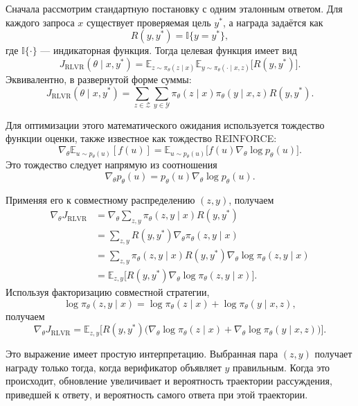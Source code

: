 Сначала рассмотрим стандартную постановку с одним эталонным ответом. Для каждого запроса \(x\) существует проверяемая цель \(y^{*}\), а награда задаётся как
\[
    R(y,y^{*})=\mathbb{I}\{y=y^{*}\},
\]
где \(\mathbb{I}\{\cdot\}\) --- индикаторная функция. Тогда целевая функция имеет вид
\[
    J_{\mathrm{RLVR}}(\theta\mid x,y^{*})
    =
    \mathbb{E}_{z\sim\pi_{\theta}(z\mid x)}
    \mathbb{E}_{y\sim\pi_{\theta}(\cdot\mid x,z)}
    \big[
        R(y,y^{*})
        \big].
\]
Эквивалентно, в развернутой форме суммы:
\[
    J_{\mathrm{RLVR}}(\theta\mid x,y^{*})
    =
    \sum_{z\in\mathcal{Z}}
    \sum_{y\in\mathcal{Y}}
    \pi_{\theta}(z\mid x)
    \pi_{\theta}(y\mid x,z)
    R(y,y^{*}).
\]

Для оптимизации этого математического ожидания используется тождество функции оценки, также известное как тождество REINFORCE:
\[
    \nabla_{\theta}
    \mathbb{E}_{u\sim p_{\theta}(u)}
        [f(u)]
    =
    \mathbb{E}_{u\sim p_{\theta}(u)}
    \big[
        f(u)\nabla_{\theta}\log p_{\theta}(u)
        \big].
\]
Это тождество следует напрямую из соотношения
\[
    \nabla_{\theta}p_{\theta}(u)
    =
    p_{\theta}(u)
    \nabla_{\theta}\log p_{\theta}(u).
\]

Применяя его к совместному распределению \((z,y)\), получаем
\begin{align*}
    \nabla_{\theta}J_{\mathrm{RLVR}}
     & =
    \nabla_{\theta}
    \sum_{z,y}
    \pi_{\theta}(z,y\mid x)
    R(y,y^{*})
    \\
     & =
    \sum_{z,y}
    R(y,y^{*})
    \nabla_{\theta}
    \pi_{\theta}(z,y\mid x)
    \\
     & =
    \sum_{z,y}
    \pi_{\theta}(z,y\mid x)
    R(y,y^{*})
    \nabla_{\theta}
    \log\pi_{\theta}(z,y\mid x)
    \\
     & =
    \mathbb{E}_{z,y}
    \Big[
        R(y,y^{*})
        \nabla_{\theta}
        \log\pi_{\theta}(z,y\mid x)
        \Big].
\end{align*}
Используя факторизацию совместной стратегии,
\[
    \log\pi_{\theta}(z,y\mid x)
    =
    \log\pi_{\theta}(z\mid x)
    +
    \log\pi_{\theta}(y\mid x,z),
\]
получаем
\[
    \nabla_{\theta}J_{\mathrm{RLVR}}
    =
    \mathbb{E}_{z,y}
    \Big[
        R(y,y^{*})
        \big(
        \nabla_{\theta}\log\pi_{\theta}(z\mid x)
        +
        \nabla_{\theta}\log\pi_{\theta}(y\mid x,z)
        \big)
        \Big].
\]

Это выражение имеет простую интерпретацию. Выбранная пара \((z,y)\) получает награду только тогда, когда верификатор объявляет \(y\) правильным. Когда это происходит, обновление увеличивает и вероятность траектории рассуждения, приведшей к ответу, и вероятность самого ответа при этой траектории.

